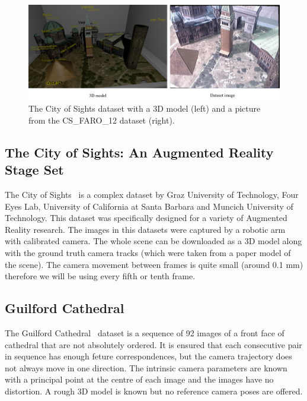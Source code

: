 \begin{figure}[ht]
	\begin{center}
		\includegraphics[keepaspectratio,width=\textwidth]{fig/experiments-city-of-sights.pdf}
	\end{center}
	\caption{The City of Sights dataset with a 3D model (left) and a picture from the CS\_FARO\_12 dataset (right).}
	\label{fig:cityofsights}
\end{figure}
\subsection*{The City of Sights: An Augmented Reality Stage Set}
The City of Sights~\cite{cityofsights_ISMAR2010} is a complex dataset by Graz University of Technology, Four Eyes Lab, University of California at Santa Barbara and Muncich University of Technology. This dataset was specifically designed for a variety of Augmented Reality research. The images in this datasets were captured by a robotic arm with calibrated camera. The whole scene can be downloaded as a 3D model along with the ground truth camera tracks (which were taken from a paper model of the scene). The camera movement between frames is quite small (around 0.1 mm) therefore we will be using every fifth or tenth frame.

\subsection*{Guilford Cathedral}
The Guilford Cathedral~\cite{cathedral} dataset is a sequence of 92 images of a front face of cathedral that are not absolutely ordered. It is ensured that each consecutive pair in sequence has enough feture correspondences, but the camera trajectory does not always move in one direction. The intrinsic camera parameters are known with a principal point at the centre of each image and the images have no distortion. A rough 3D model is known but no reference camera poses are offered.

